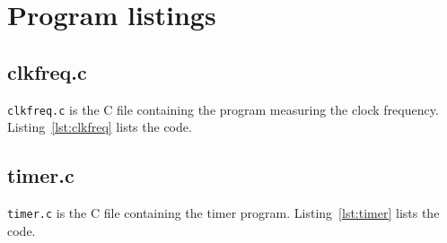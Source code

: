 \section{Program listings}
\subsection{clkfreq.c}
\texttt{clkfreq.c} is the C file containing the program measuring the clock frequency. Listing~\ref{lst:clkfreq} lists the code.


\subsection{timer.c}
\texttt{timer.c} is the C file containing the timer program. Listing~\ref{lst:timer} lists the code.
